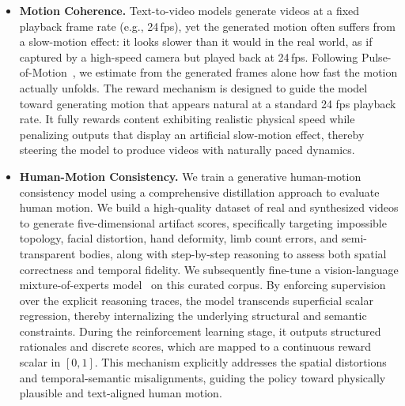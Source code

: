 \begin{itemize}
    \item \textbf{Motion Coherence.}
    Text-to-video models generate videos at a fixed playback frame rate (e.g., 24\,fps), yet the generated motion often suffers from a slow-motion effect: it looks slower than it would in the real world, as if captured by a high-speed camera but played back at 24\,fps.
    Following Pulse-of-Motion~\cite{gao2026pulse-of-motion}, we estimate from the generated frames alone how fast the motion actually unfolds.
    The reward mechanism is designed to guide the model toward generating motion that appears natural at a standard 24 fps playback rate. It fully rewards content exhibiting realistic physical speed while penalizing outputs that display an artificial slow-motion effect, thereby steering the model to produce videos with naturally paced dynamics.
    
    \item \textbf{Human-Motion Consistency.} 
    We train a generative human-motion consistency model using a comprehensive distillation approach to evaluate human motion. 
    We build a high-quality dataset of real and synthesized videos to generate five-dimensional artifact scores, specifically targeting impossible topology, facial distortion, hand deformity, limb count errors, and semi-transparent bodies, along with step-by-step reasoning to assess both spatial correctness and temporal fidelity. 
    We subsequently fine-tune a vision-language mixture-of-experts model~\cite{qwen3.6-27b} on this curated corpus. 
    By enforcing supervision over the explicit reasoning traces, the model transcends superficial scalar regression, thereby internalizing the underlying structural and semantic constraints. During the reinforcement learning stage, it outputs structured rationales and discrete scores, which are mapped to a continuous reward scalar in $[0, 1]$. 
    This mechanism explicitly addresses the spatial distortions and temporal-semantic misalignments, guiding the policy toward physically plausible and text-aligned human motion.


\end{itemize}
